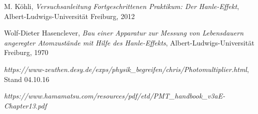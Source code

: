 \documentclass[12pt]{article}
\begin{document}
\newpage
\listoffigures


\newpage
\thispagestyle{empty}
\begin{thebibliography}{9}

  

  
  

M. Köhli,
\emph{Versuchsanleitung Fortgeschrittenen Praktikum: Der Hanle-Effekt},
Albert-Ludwigs-Universität Freiburg,
2012

Wolf-Dieter Hasenclever,
\emph{Bau einer Apparatur zur Messung von Lebensdauern angeregter Atomzustände mit Hilfe des Hanle-Effekts},
Albert-Ludwigs-Universität Freiburg,
1970

\emph{https://www-zeuthen.desy.de/exps/physik\_begreifen/chris/Photomultiplier.html}, Stand 04.10.16

\emph{https://www.hamamatsu.com/resources/pdf/etd/PMT\_handbook\_v3aE-Chapter13.pdf}
\end{thebibliography}
\end{document}
